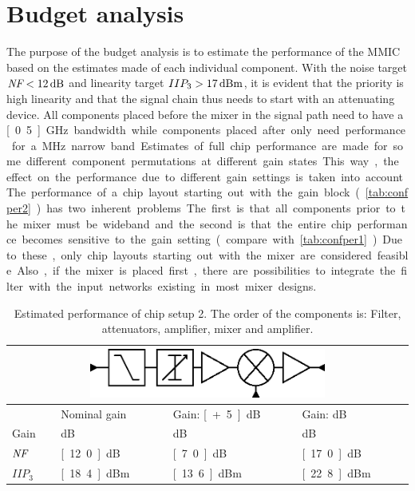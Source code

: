 	\section{Budget analysis}\label{sec:budget_analysis}
		The purpose of the budget analysis is to estimate the performance of the MMIC based on the estimates made of each individual component. With the noise target $\nf<\unit[12]{dB}$ and linearity target $IIP_3>\unit[17]{dBm}$, it is evident that the priority is high linearity and that the signal chain thus needs to start with an attenuating device. All components placed before the mixer in the signal path need to have a \unit[0.5]{GHz} bandwidth while components placed after only need performance for a \unit[20]{MHz} narrow band. Estimates of full chip performance are made for some different component permutations at different gain states. This way, the effect on the performance due to different gain settings is taken into account.

		The performance of a chip layout starting out with the gain block (\autoref{tab:confper2}) has two inherent problems. The first is that all components prior to the mixer must be wideband and the second is that the entire chip performance becomes sensitive to the gain setting (compare with \autoref{tab:confper1}). Due to these, only chip layouts starting out with the mixer are considered feasible. Also, if the mixer is placed first, there are possibilities to integrate the filter with the input networks existing in most mixer designs.

		\begin{table}[hpt!]
			\caption[Estimated performance of chip setup 2.]{Estimated performance of chip setup 2. The order of the components is: Filter, attenuators, amplifier, mixer and amplifier.}
			\label{tab:confper2}
			\centering
			\begin{tabular}{ l l l l }
				\multicolumn{4}{c}{\includegraphics[width=0.6\textwidth]{fig/system/sys2}} \\\toprule
				& Nominal gain & Gain: \unit[+5]{dB} & Gain: \unit[-5]{dB} \\\midrule
				Gain & \unit[9]{dB} & \unit[14]{dB} & \unit[4]{dB} \\
				$\emph{NF}$ & \unit[12.0]{dB} & \unit[7.0]{dB} & \unit[17.0]{dB} \\
				$IIP_3$ & \unit[18.4]{dBm} & \unit[13.6]{dBm} & \unit[22.8]{dBm} \\\bottomrule
			\end{tabular}
		\end{table}

